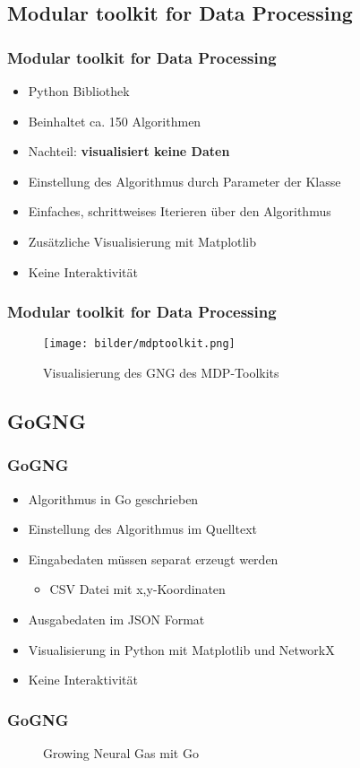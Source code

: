 \subsection{Modular toolkit for Data Processing}
\begin{frame}
	\frametitle{Modular toolkit for Data Processing}
	\begin{itemize}
		\item Python Bibliothek
		\item Beinhaltet ca. 150 Algorithmen
		\item Nachteil: \textbf{visualisiert keine Daten}
		\item Einstellung des Algorithmus durch Parameter der Klasse
		\item Einfaches, schrittweises Iterieren über den Algorithmus
		\item Zusätzliche Visualisierung mit Matplotlib
		\item Keine Interaktivität
	\end{itemize}
\end{frame}
\begin{frame}
	\frametitle{Modular toolkit for Data Processing}
	\begin{figure}[h!]
		\centering
		\texttt{[image: bilder/mdptoolkit.png]}
		\caption{Visualisierung des GNG des MDP-Toolkits}
		\label{fig:mdptoolkit}
	\end{figure}
\end{frame}

\subsection{GoGNG}
\begin{frame}
	\frametitle{GoGNG}
	\begin{itemize}
		\item Algorithmus in Go geschrieben
		\item Einstellung des Algorithmus im Quelltext
		\item Eingabedaten müssen separat erzeugt werden
		\begin{itemize}
			\item CSV Datei mit x,y-Koordinaten
		\end{itemize}
		\item Ausgabedaten im JSON Format
		\item Visualisierung in Python mit Matplotlib und NetworkX
		\item Keine Interaktivität
	\end{itemize}
\end{frame}
\begin{frame}
	\frametitle{GoGNG}
	\begin{figure}[h!]
		\centering
		\caption{Growing Neural Gas mit Go}
		\label{fig:go}
	\end{figure}
\end{frame}
